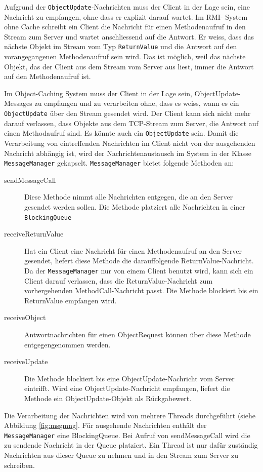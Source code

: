 Aufgrund der \verb|ObjectUpdate|-Nachrichten muss der Client in der Lage sein, eine Nachricht zu empfangen, ohne dass er explizit darauf wartet. Im RMI- System ohne Cache schreibt ein Client die Nachricht für einen Methodenaufruf in den Stream zum Server und wartet anschliessend auf die Antwort. Er weiss, dass das nächste Objekt im Stream vom Typ \texttt{ReturnValue} und die Antwort auf den vorangegangenen Methodenaufruf sein wird. Das ist möglich, weil das nächste Objekt, das der Client aus dem Stream vom Server aus liest, immer die Antwort auf den Methodenaufruf ist.

Im Object-Caching System muss der Client in der Lage sein, Object\-Update\--Messages zu empfangen und zu verarbeiten ohne, dass es weiss, wann es ein \verb|ObjectUpdate| über den Stream gesendet wird. Der Client kann sich nicht mehr darauf verlassen, dass Objekte aus dem TCP-Stream zum Server, die Antwort auf einen Methodaufruf sind. Es könnte auch ein \texttt{ObjectUpdate} sein. Damit die Verarbeitung von eintreffenden Nach\-richten im Client nicht von der ausgehenden Nachricht abhängig ist, wird der Nach\-richt\-enaustausch im System in der Klasse \verb|MessageManager| gekapselt. \texttt{MessageManager} bietet folgende Methoden an:

\begin{description}
\item[sendMessageCall] Diese Methode nimmt alle Nachrichten entgegen, die an den Server gesendet werden sollen. Die Methode platziert alle Nachrichten in einer \verb|BlockingQueue| 
\item[receiveReturnValue] Hat ein Client eine Nachricht für einen Methodenaufruf an den Server gesendet, liefert diese Methode die darauffolgende ReturnValue-Nachricht. Da der \verb+MessageManager+ nur von einem Client benutzt wird, kann sich ein Client darauf verlassen, dass die ReturnValue-Nachricht zum vorhergehenden MethodCall-Nach\-richt passt. Die Methode blockiert bis ein ReturnValue empfangen wird.
\item[receiveObject] Antwortnachrichten für einen ObjectRequest können über diese Methode entgegengenommen werden. 
\item[receiveUpdate] Die Methode blockiert bis eine ObjectUpdate-Nachricht vom Server eintrifft. Wird eine ObjectUpdate-Nachricht empfangen, liefert die Methode ein ObjectUpdate-Objekt als Rückgabewert.
\end{description}

Die Verarbeitung der Nachrichten wird von mehrere Threads durchgeführt (siehe Abbildung \ref{fig:msgmng}.
Für ausgehende Nachrichten enthält der \verb|MessageManager| eine BlockingQueue. Bei Aufruf von sendMessageCall wird die zu sendende Nachricht in der Queue platziert. Ein Thread ist nur dafür zuständig Nachrichten aus dieser Queue zu nehmen und in den Stream zum Server zu schreiben.


